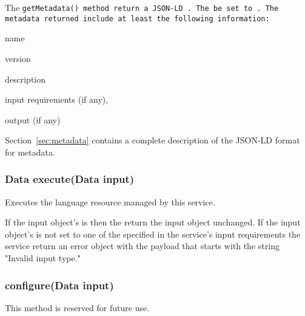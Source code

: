 The \tt{getMetadata()} method \must return a JSON-LD \payload. The \discriminator \should be set to . The metadata returned \should include at least the following information:
\begin{listing}
	\item name
	\item version
	\item description
	\item input requirements (if any),
	\item output (if any)
\end{listing}
Section~\ref{sec:metadata} contains a complete description of the JSON-LD format for \lapps metadata.

\subsubsection{Data execute(Data input)}


Executes the language resource managed by this service.  

If the input \data object's \discriminator is  then the \service \must return the input object unchanged.  If the input \data object's \discriminator is not set to one of the specified in the service's input requirements the service \should return an error object with the payload that starts with the string "Invalid input type."

\subsubsection{configure(Data input)}

This method is reserved for future use.